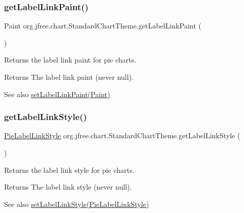 \subsubsection{\texorpdfstring{get\+Label\+Link\+Paint()}{getLabelLinkPaint()}}
{\footnotesize\ttfamily Paint org.\+jfree.\+chart.\+Standard\+Chart\+Theme.\+get\+Label\+Link\+Paint (\begin{DoxyParamCaption}{ }\end{DoxyParamCaption})}

Returns the label link paint for pie charts.

\begin{DoxyReturn}{Returns}
The label link paint (never {\ttfamily null}).
\end{DoxyReturn}
\begin{DoxySeeAlso}{See also}
\mbox{\hyperlink{classorg_1_1jfree_1_1chart_1_1_standard_chart_theme_ac48a6a4060505c5f9627aa0c10e3da42}{set\+Label\+Link\+Paint(\+Paint)}} 
\end{DoxySeeAlso}
\mbox{\label{classorg_1_1jfree_1_1chart_1_1_standard_chart_theme_ad9307f3123c0bb7f50910dce759ddcf4}} 
\subsubsection{\texorpdfstring{get\+Label\+Link\+Style()}{getLabelLinkStyle()}}
{\footnotesize\ttfamily \mbox{\hyperlink{classorg_1_1jfree_1_1chart_1_1plot_1_1_pie_label_link_style}{Pie\+Label\+Link\+Style}} org.\+jfree.\+chart.\+Standard\+Chart\+Theme.\+get\+Label\+Link\+Style (\begin{DoxyParamCaption}{ }\end{DoxyParamCaption})}

Returns the label link style for pie charts.

\begin{DoxyReturn}{Returns}
The label link style (never {\ttfamily null}).
\end{DoxyReturn}
\begin{DoxySeeAlso}{See also}
\mbox{\hyperlink{classorg_1_1jfree_1_1chart_1_1_standard_chart_theme_aec49f0c54df7d3c6a9b6e3efc2a01b6a}{set\+Label\+Link\+Style(\+Pie\+Label\+Link\+Style)}} 
\end{DoxySeeAlso}
\mbox{\label{classorg_1_1jfree_1_1chart_1_1_standard_chart_theme_a55c6caf1eb9cfc15990f39b9bf69573d}} 
